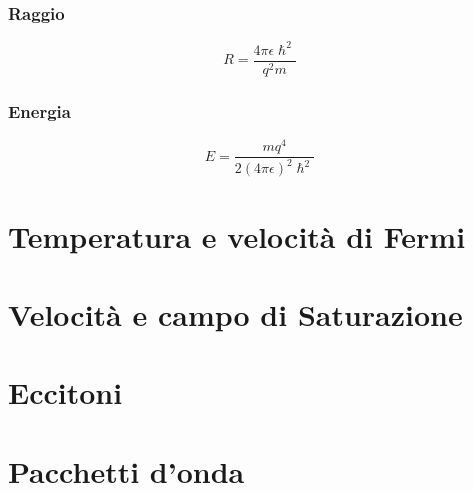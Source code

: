 \documentclass[10pt,a4paper]{report}
\begin{document}
		\subsection{Raggio}

		\[
		R=\frac{4\pi \epsilon \hslash^2}{q^2 m}	
		\]

		\subsection{Energia}

		\[
		E=\frac{mq^4}{2(4\pi \epsilon)^2 \hslash^2}
		\]

\chapter{Temperatura e velocità di Fermi}

\chapter{Velocità e campo di Saturazione}

\chapter{Eccitoni}

\chapter{Pacchetti d'onda}
\end{document}

